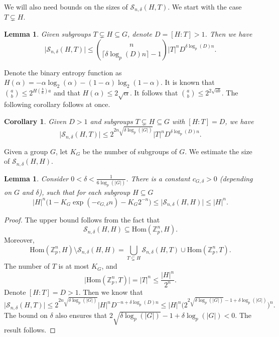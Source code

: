 \documentclass[12pt]{amsart}
\newtheorem{corollary}{Corollary}[theorem]
\newtheorem{lemma}[theorem]{Lemma}
\theoremstyle{definition}
\newcommand{\SSS}[3]{\mathcal{S}_{#1}(#2,#3)}
\newcommand{\abs}[1]{\vert#1\vert}
\newcommand{\Zp}{\Z_p}
\newcommand{\Z}{\mathbb{Z}}
\newcommand{\Hom}{\text{Hom}}
\newcommand{\ceil}[1]{\lceil#1\rceil}
\begin{document}
We will also need bounds on the sizes of $\SSS{n,\delta}{H}{T}$. We start with the case $T\subsetneq H$.



\begin{lemma}\cite[Lemma 5.2]{wood2017distribution}
Given subgroups $T\subsetneq H\subseteq G$, denote $D=[H:T]>1$. Then we have
\[
\abs{\SSS{n,\delta}{H}{T}}
\leq\binom{n}{\ceil{\delta\log_p(D) n}-1} \abs{T}^n D^{\delta\log_p(D)n}.
\]
\end{lemma}

Denote the binary entropy function as $H(\alpha)=-\alpha\log_2(\alpha)-(1-\alpha)\log_2(1-\alpha)$. It is known that $\binom{a}{b}\leq 2^{H(\frac{b}{a})a}$ and that $H(\alpha)\leq 2\sqrt{\alpha}$. It follows that $\binom{a}{b}\leq 2^{2\sqrt{ab}}$.
The following corollary follows at once.
\begin{corollary}
Given $D>1$ and subgroups $T\subsetneq H\subseteq G$ with $[H:T]=D$, we have
\[
\abs{\SSS{n,\delta}{H}{T}}
\leq 2^{2n\sqrt{\delta\log_p(\abs{G})}}
\abs{T}^n D^{\delta\log_p(D)n}.
\]
\end{corollary}

Given a group $G$, let $K_G$ be the number of subgroups of $G$.
We estimate the size of $\SSS{n,\delta}{H}{H}$.

\begin{lemma}\label{Lem: count codes}
Consider $0<\delta<\frac{1}{6\log_p(\abs{G})}$.
There is a constant $c_{G,\delta}>0$ (depending on $G$ and $\delta$), such that for each subgroup $H\subseteq G$
\[
\abs{H}^n \Big(1- K_G \exp(-c_{G,\delta}n) - K_G 2^{-n}\Big)
\leq \abs{\SSS{n,\delta}{H}{H}}
\leq \abs{H}^n.
\]
\end{lemma}
\begin{proof}
The upper bound follows from the fact that
\[
\SSS{n,\delta}{H}{H} \subseteq \Hom(\Zp^n, H).
\]
Moreover,
\[
\Hom(\Zp^n, H) \setminus \SSS{n,\delta}{H}{H}
=\bigcup_{T\subsetneq H} \SSS{n,\delta}{H}{T} \cup \Hom(\Zp^n,T).
\]
The number of $T$ is at most $K_G$, and 
\[
\abs{\Hom(\Zp^n,T)}
= \abs{T}^n \leq \frac{\abs{H}^n}{2^n}.
\]
Denote $[H:T]=D>1$. Then we know that
\[
\abs{\SSS{n,\delta}{H}{T}}
\leq 2^{2n\sqrt{\delta\log_p(\abs{G})}}
\abs{H}^n D^{-n+\delta\log_p(D)n}
\leq 
\abs{H}^n \Big(2^{2\sqrt{\delta\log_p(\abs{G})}-1+\delta\log_p(\abs{G})}\Big)^n.
\]
The bound on $\delta$ also ensures that $2\sqrt{\delta\log_p(\abs{G})}-1+\delta\log_p(\abs{G})<0$. The result follows.
\end{proof}
\end{document}
